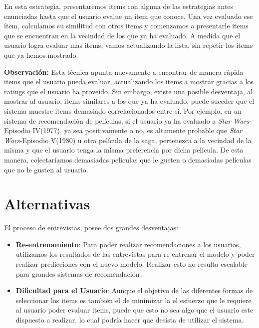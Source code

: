 \documentclass[hidelinks,12pt,a4paper]{book}
\theoremstyle{plain}
\theoremstyle{definition}
\begin{document}
En esta estrategia\cite{CS:rashid2002getting}, presentaremos items con alguna de las estrategias antes enunciadas hasta que el usuario evalue un ítem que conoce. Una vez evaluado ese ítem, calculamos su similitud con otros items y comenzamos a presentarle items que se encuentran en la vecindad de los que ya ha evaluado. A medida que el usuario logra evaluar mas items, vamos actualizando la lista, sin repetir los items que ya hemos mostrado.

\textbf{Observación:} Esta técnica apunta nuevamente a encontrar de manera rápida items que el usuario pueda evaluar, actualizando los items a mostrar gracias a los ratings que el usuario ha proveído. Sin embargo, existe una posible desventaja, al mostrar al usuario, items similares a los que ya ha evaluado, puede suceder que el sistema muestre items demasiado correlacionados entre sí. Por ejemplo, en un sistema de recomendación de películas, si el usuario ya ha evaluado a \textit{Star Wars}-Episodio IV(1977), ya sea positivamente o no, es altamente probable que \textit{Star Wars}-Episodio V(1980) u otra película de la saga, pertenezca a la vecindad de la misma y que el usuario tenga la misma preferencia por dicha película. De esta manera, colectaríamos demasiadas películas que le gusten o demasiadas películas que no le gusten al usuario.


\section{Alternativas} \label{cap:propuestas}

El proceso de entrevistas, posee dos grandes desventajas:

\begin{itemize}
\item \textbf{Re-entrenamiento}: Para poder realizar recomendaciones a los usuarios, utilizamos los resultados de las entrevistas para re-entrenar el modelo y poder realizar predicciones con el nuevo modelo. Realizar esto no resulta escalable para grandes sistemas de recomendación 
\item \textbf{Dificultad para el Usuario}: Aunque el objetivo de las diferentes formas de seleccionar los items es también el de minimizar la el esfuerzo que le requiere al usuario poder evaluar items, puede que esto no sea algo que el usuario este dispuesto a realizar, lo cual podría hacer que desista de utilizar el sistema.
\end{itemize}
\end{document}
